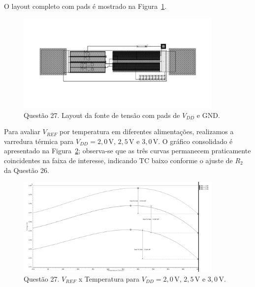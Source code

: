 \documentclass[12pt,a4paper]{article}
\begin{document}
O layout completo com pads é mostrado na Figura~\ref{fig:q27_layout}.

\begin{figure}[H]
    \centering
    \includegraphics[width=0.9\textwidth]{images/layout27.png}
    \caption{Questão 27. Layout da fonte de tensão com pads de $V_{DD}$ e GND.}
    \label{fig:q27_layout}
\end{figure}

Para avaliar $V_{REF}$ por temperatura em diferentes alimentações, realizamos a varredura térmica para $V_{DD}=2{,}0$\,V, $2{,}5$\,V e $3{,}0$\,V. O gráfico consolidado é apresentado na Figura~\ref{fig:q27_vref_temp}; observa-se que as três curvas permanecem praticamente coincidentes na faixa de interesse, indicando TC baixo conforme o ajuste de $R_2$ da Questão 26.

\begin{figure}[H]
    \centering
    \includegraphics[width=0.9\textwidth]{images/curvas27.png}
    \caption{Questão 27. $V_{REF}$ x Temperatura para $V_{DD}=2{,}0$\,V, $2{,}5$\,V e $3{,}0$\,V.}
    \label{fig:q27_vref_temp}
\end{figure}
\end{document}
